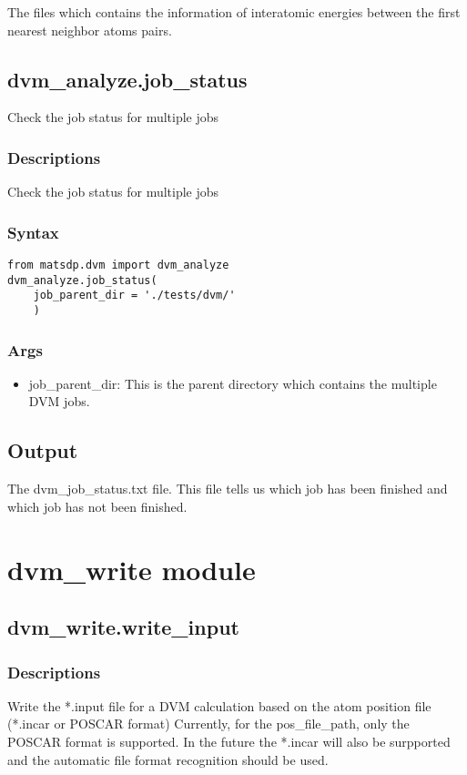 \documentclass[12pt]{book}
\begin{document}
The files which contains the information of interatomic energies between the first nearest neighbor atoms pairs.

\subsection{dvm\_analyze.job\_status}
Check the job status for multiple jobs

\subsubsection{Descriptions}
Check the job status for multiple jobs
\subsubsection{Syntax}
\begin{lstlisting}
from matsdp.dvm import dvm_analyze
dvm_analyze.job_status(
    job_parent_dir = './tests/dvm/'
    )
\end{lstlisting}
\subsubsection{Args}
\begin{itemize}
\item job\_parent\_dir: This is the parent directory which contains the multiple DVM jobs.
\end{itemize}

\subsection{Output}
The dvm\_job\_status.txt file. This file tells us which job has been finished and which job has not been finished.

\section{dvm\_write module}

\subsection{dvm\_write.write\_input}
\subsubsection{Descriptions}
Write the *.input file for a DVM calculation based on the atom position file (*.incar or POSCAR format)
Currently, for the pos\_file\_path, only the POSCAR format is supported. In the future the *.incar will also be surpported and the automatic file format recognition should be used.
\end{document}
